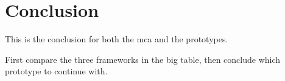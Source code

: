 \section{Conclusion}\label{sec:conclusion}
This is the conclusion for both the mca and the prototypes.

First compare the three frameworks in the big table, then conclude which prototype to continue with.
